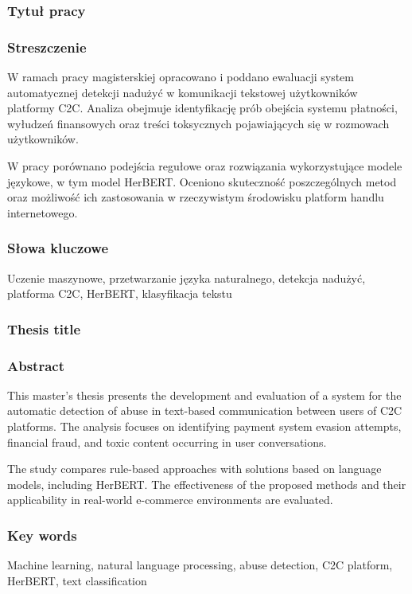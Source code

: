 \subsubsection*{Tytuł pracy}
\Title

\subsubsection*{Streszczenie}
W ramach pracy magisterskiej opracowano i poddano ewaluacji system automatycznej detekcji nadużyć w komunikacji tekstowej użytkowników platformy C2C. Analiza obejmuje identyfikację prób obejścia systemu płatności, wyłudzeń finansowych oraz treści toksycznych pojawiających się w rozmowach użytkowników.

W pracy porównano podejścia regułowe oraz rozwiązania wykorzystujące modele językowe, w tym model HerBERT. Oceniono skuteczność poszczególnych metod oraz możliwość ich zastosowania w rzeczywistym środowisku platform handlu internetowego.

\subsubsection*{Słowa kluczowe}
Uczenie maszynowe, przetwarzanie języka naturalnego, detekcja nadużyć, platforma C2C, HerBERT, klasyfikacja tekstu

\subsubsection*{Thesis title}
\begin{otherlanguage}{british}
\TitleAlt
\end{otherlanguage}

\subsubsection*{Abstract}
\begin{otherlanguage}{british}
This master's thesis presents the development and evaluation of a system for the automatic detection of abuse in text-based communication between users of C2C platforms. The analysis focuses on identifying payment system evasion attempts, financial fraud, and toxic content occurring in user conversations.

The study compares rule-based approaches with solutions based on language models, including HerBERT. The effectiveness of the proposed methods and their applicability in real-world e-commerce environments are evaluated.
\end{otherlanguage}
\subsubsection*{Key words}
\begin{otherlanguage}{british}
Machine learning, natural language processing, abuse detection, C2C platform, HerBERT, text classification
\end{otherlanguage}
